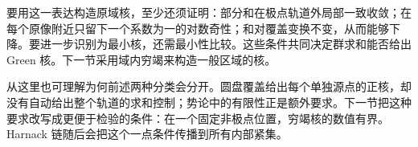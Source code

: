 \ProseParagraphBreak
要用这一表达构造原域核，至少还须证明：部分和在极点轨道外局部一致收敛；在每个原像附近只留下一个系数为一的对数奇性；和对覆盖变换不变，从而能够下降。要进一步识别为最小核，还需最小性比较。这些条件共同决定群求和能否给出 Green 核。下一节采用域内穷竭来构造一般区域的核。

\ProseParagraphBreak
从这里也可理解为何前述两种分类会分开。圆盘覆盖给出每个单独源点的正核，却没有自动给出整个轨道的求和控制；势论中的有限性正是额外要求。下一节把这种要求改写成更便于检验的条件：在一个固定非极点位置，穷竭核的数值有界。Harnack 链随后会把这个一点条件传播到所有内部紧集。

